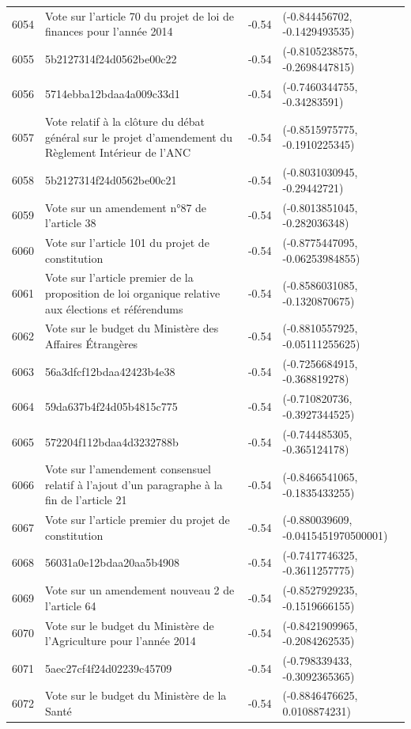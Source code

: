 \begin{table}[ht]
\begin{tabular}{rlrl}
  6054 & Vote sur l'article 70 du projet de loi de finances pour l'année 2014 & -0.54 & (-0.844456702, -0.1429493535) \\ 
  6055 & 5b2127314f24d0562be00c22 & -0.54 & (-0.8105238575, -0.2698447815) \\ 
  6056 & 5714ebba12bdaa4a009c33d1 & -0.54 & (-0.7460344755, -0.34283591) \\ 
  6057 & Vote relatif à la clôture du débat général sur le projet d'amendement du Règlement Intérieur de l'ANC & -0.54 & (-0.8515975775, -0.1910225345) \\ 
  6058 & 5b2127314f24d0562be00c21 & -0.54 & (-0.8031030945, -0.29442721) \\ 
  6059 & Vote sur un amendement n°87 de l'article 38 & -0.54 & (-0.8013851045, -0.282036348) \\ 
  6060 & Vote sur l'article 101 du projet de constitution & -0.54 & (-0.8775447095, -0.06253984855) \\ 
  6061 & Vote sur l'article premier de la proposition de loi organique relative aux élections et référendums & -0.54 & (-0.8586031085, -0.1320870675) \\ 
  6062 & Vote sur le budget du Ministère des Affaires Étrangères & -0.54 & (-0.8810557925, -0.05111255625) \\ 
  6063 & 56a3dfcf12bdaa42423b4e38 & -0.54 & (-0.7256684915, -0.368819278) \\ 
  6064 & 59da637b4f24d05b4815c775 & -0.54 & (-0.710820736, -0.3927344525) \\ 
  6065 & 572204f112bdaa4d3232788b & -0.54 & (-0.744485305, -0.365124178) \\ 
  6066 & Vote sur l'amendement consensuel relatif à l'ajout d'un paragraphe à la fin de l'article 21 & -0.54 & (-0.8466541065, -0.1835433255) \\ 
  6067 & Vote sur l'article premier du projet de constitution & -0.54 & (-0.880039609, -0.0415451970500001) \\ 
  6068 & 56031a0e12bdaa20aa5b4908 & -0.54 & (-0.7417746325, -0.3611257775) \\ 
  6069 & Vote sur un amendement nouveau 2 de l'article 64 & -0.54 & (-0.8527929235, -0.1519666155) \\ 
  6070 & Vote sur le budget du Ministère de l'Agriculture pour l'année 2014 & -0.54 & (-0.8421909965, -0.2084262535) \\ 
  6071 & 5aec27cf4f24d02239c45709 & -0.54 & (-0.798339433, -0.3092365365) \\ 
  6072 & Vote sur le budget du Ministère de la Santé & -0.54 & (-0.8846476625, 0.0108874231) \\ 

\end{tabular}
\end{table}
